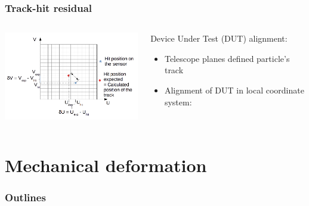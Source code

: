 \documentclass{beamer}
\begin{document}
\begin{frame}
    \frametitle{Track-hit residual}

    \begin{columns}[t]
      \begin{column}{7cm}
        \begin{center}
          \includegraphics[width = 7cm]{Pictures/residual_explanation.png}
        \end{center}
      \end{column}
      \begin{column}{4cm}
        \scriptsize{
        \begin{block}{Device Under Test (DUT) alignment:}
          \begin{itemize}
            \item Telescope planes defined particle's track
            \item Alignment of DUT in local coordinate system:
          \end{itemize}
        \end{block}
      }
      \end{column}
    \end{columns}
\end{frame}

\section{Mechanical deformation}
\begin{frame}
  \frametitle{Outlines}
  \begin{minipage}{\textwidth}
    \tableofcontents[currentsection,hideothersubsections, 
    sectionstyle=show/shaded]
  \end{minipage}
\end{frame}
\end{document}
